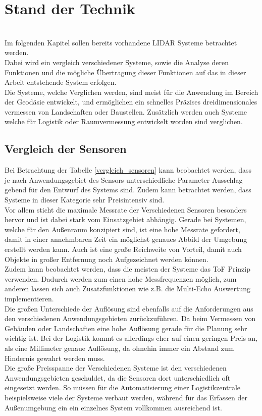 \chapter{Stand der Technik}\label{chap:stand_der_technik}
\\
Im folgenden Kapitel sollen bereits vorhandene \ac{LIDAR} Systeme betrachtet werden.\\
Dabei wird ein vergleich verschiedener Systeme, sowie die Analyse deren Funktionen und die mögliche Übertragung dieser Funktionen auf das in dieser Arbeit entstehende System erfolgen.\\
Die Systeme, welche Verglichen werden, sind meist für die Anwendung im Bereich der Geodäsie entwickelt, und ermöglichen ein schnelles Präzises dreidimensionales vermessen von Landschaften oder Baustellen. Zusätzlich werden auch Systeme welche für Logistik oder Raumvermessung entwickelt worden sind verglichen. \\

\section{Vergleich der Sensoren}
Bei Betrachtung der Tabelle \ref{vergleich_sensoren} kann beobachtet werden, dass je nach Anwendungsgebiet des Sensors unterschiedliche Parameter Ausschlag gebend für den Entwurf des Systems sind. Zudem kann betrachtet werden, dass Systeme in dieser Kategorie sehr Preisintensiv sind. \\
Vor allem sticht die maximale Messrate der Verschiedenen Sensoren besonders hervor und ist dabei stark vom Einsatzgebiet abhängig. Gerade bei Systemen, welche für den Außenraum konzipiert sind, ist eine hohe Messrate gefordert, damit in einer annehmbaren Zeit ein möglichst genaues Abbild der Umgebung erstellt werden kann. Auch ist eine große Reichweite von Vorteil, damit auch Objekte in großer Entfernung noch Aufgezeichnet werden können. \\
Zudem kann beobachtet werden, dass die meisten der Systeme das \ac{ToF} Prinzip verwenden. Dadurch werden zum einen hohe Messfrequenzen möglich, zum anderen lassen sich auch Zusatzfunktionen wie z.B. die Multi-Echo Auswertung implementieren. \\
Die großen Unterschiede der Auflösung sind ebenfalls auf die Anforderungen aus den verschiedenen Anwendungsgebieten zurückzuführen. Da beim Vermessen von Gebäuden oder Landschaften eine hohe Auflösung gerade für die Planung sehr wichtig ist. Bei der Logistik kommt es allerdings eher auf einen geringen Preis an, als eine Millimeter genaue Auflösung, da ohnehin immer ein Abstand zum Hindernis gewahrt werden muss.\\
Die große Preisspanne der Verschiedenen Systeme ist den verschiedenen Anwendungsgebieten geschuldet, da die Sensoren dort unterschiedlich oft eingesetzt werden. So müssen für die Automatisierung einer Logistikzentrale beispielsweise viele der Systeme verbaut werden, während für das Erfassen der Außenumgebung ein ein einzelnes System vollkommen ausreichend ist.

